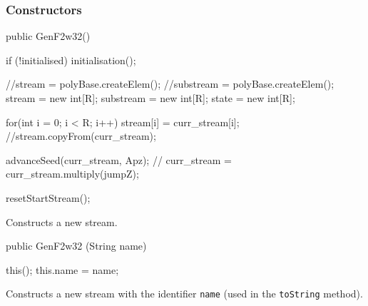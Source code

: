 \subsubsection* {Constructors}

\begin{code}
   public GenF2w32() \begin{hide} {
      if (!initialised)
         initialisation();

      //stream = polyBase.createElem();
      //substream = polyBase.createElem();
      stream = new int[R];
      substream = new int[R];
      state = new int[R];

      for(int i = 0; i < R; i++)
         stream[i] = curr_stream[i];
      //stream.copyFrom(curr_stream);

      advanceSeed(curr_stream, Apz);
      //      curr_stream = curr_stream.multiply(jumpZ);

      resetStartStream();
   } \end{hide}
\end{code}
\begin{tabb} Constructs a new stream.
\end{tabb}
\begin{code}

   public GenF2w32 (String name) \begin{hide} {
      this();
      this.name = name;
   } \end{hide}
\end{code}
\begin{tabb} Constructs a new stream with the identifier \texttt{name}
  (used in the \texttt{toString} method).
\end{tabb}
\begin{htmlonly}
\end{htmlonly}

